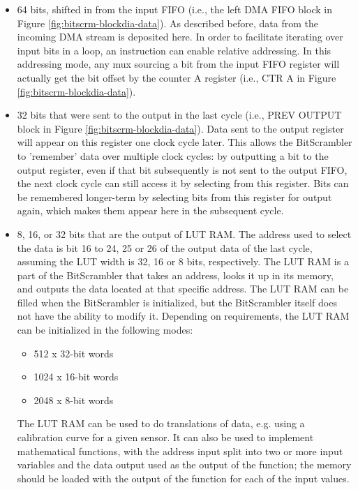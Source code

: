 \documentclass[main\_\_EN.tex]{subfiles}
\begin{document}
\begin{itemize}
\item 64 bits, shifted in from the input FIFO (i.e., the left DMA FIFO block in Figure \ref{fig:bitscrm-blockdia-data}).
As described before, data from the incoming DMA stream is deposited here. In order to facilitate iterating over input bits in a loop, an instruction can enable relative addressing. In this addressing mode, any mux sourcing a bit from the input FIFO register will actually get the bit offset by the counter A register (i.e., CTR A in Figure \ref{fig:bitscrm-blockdia-data}).

\item 32 bits that were sent to the output in the last cycle (i.e., PREV OUTPUT block in Figure \ref{fig:bitscrm-blockdia-data}).
Data sent to the output register will appear on this register one clock cycle later. This allows the BitScrambler to 'remember' data over multiple clock cycles: by outputting a bit to the output register, even if that bit subsequently is not sent to the output FIFO, the next clock cycle can still access it by selecting from this register. Bits can be remembered longer-term by selecting bits from this register for output again, which makes them appear here in the subsequent cycle.


\item 8, 16, or 32 bits that are the output of LUT RAM. The address used to select the data is bit 16 to 24, 25 or 26 of the output data of the last cycle, assuming the LUT width is 32, 16 or 8 bits, respectively.
The LUT RAM is a part of the BitScrambler that takes an address, looks it up in its memory, and outputs the data located at that specific address. The LUT RAM can be filled when the BitScrambler is initialized, but the BitScrambler itself does not have the ability to modify it. Depending on requirements, the LUT RAM can be initialized in the following modes:

\begin{itemize}
    \item 512 x 32-bit words
    \item 1024 x 16-bit words
    \item 2048 x 8-bit words
\end{itemize}

The LUT RAM can be used to do translations of data, e.g. using a calibration curve for a given sensor. It can also be used to implement mathematical functions, with the address input split into two or more input variables and the data output used as the output of the function; the memory should be loaded with the output of the function for each of the input values.


\end{itemize}
\end{document}
